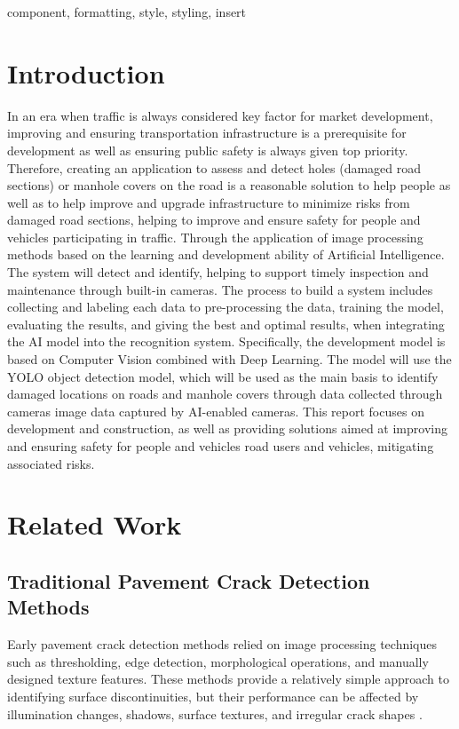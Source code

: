 \documentclass[conference]{IEEEtran}
\begin{document}
\begin{IEEEkeywords}
component, formatting, style, styling, insert
\end{IEEEkeywords}

\section{Introduction}
In an era when traffic is always considered key factor for market development, improving and ensuring transportation infrastructure is a prerequisite for development as well as ensuring public safety is always given top priority.
Therefore, creating an application to assess and detect holes (damaged road sections) or manhole covers on the road is a reasonable solution to help people as well as to help improve and upgrade infrastructure to minimize risks from damaged road sections, helping to improve and ensure safety for people and vehicles participating in traffic. Through the application of image processing methods based on the learning and development ability of Artificial Intelligence. The system will detect and identify, helping to support timely inspection and maintenance through built-in cameras.
The process to build a system includes collecting and labeling each data to pre-processing the data, training the model, evaluating the results, and giving the best and optimal results, when integrating the AI model into the recognition system. Specifically, the development model is based on Computer Vision combined with Deep Learning. The model will use the YOLO object detection model, which will be used as the main basis to identify damaged locations on roads and manhole covers through data collected through cameras image data captured by AI-enabled cameras.
This report focuses on development and construction, as well as providing solutions aimed at improving and ensuring safety for people and vehicles road users and vehicles, mitigating associated risks.


\section{Related Work}
\label{sec:related_work}

\subsection{Traditional Pavement Crack Detection Methods}

Early pavement crack detection methods relied on image processing
techniques such as thresholding, edge detection, morphological
operations, and manually designed texture features. These methods
provide a relatively simple approach to identifying surface
discontinuities, but their performance can be affected by illumination
changes, shadows, surface textures, and irregular crack shapes
\cite{P1_SDNET2018,P8_ConcreteCrackContextAware,P14_PavementCrackDL}.
\end{document}
